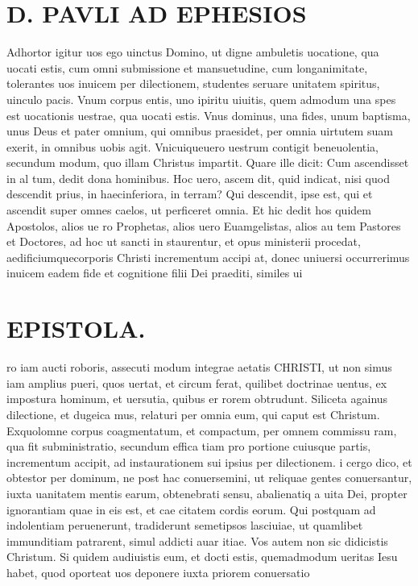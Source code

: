 \documentclass{article}
\begin{document}
\begin{pages}
\section*{D. PAVLI AD EPHESIOS }
\marginpar{[ p.2. ]}
\marginpar{[ p.3.  ]}
\marginpar{[ p.4.  ]}\pstart Adhortor igitur uos ego uinctus Domino, ut digne ambuletis uocatione, qua uocati estis, cum omni submissione et mansuetudine, cum longanimitate, tolerantes uos inuicem per dilectionem, studentes seruare unitatem spiritus, uinculo pacis.  \pend\pstart Vnum corpus entis, uno ipiritu uiuitis, quem admodum una spes est uocationis uestrae, qua uocati estis. Vnus dominus, una fides, unum baptisma, unus Deus et pater omnium, qui omnibus praesidet, per omnia uirtutem suam exerit, in omnibus uobis agit.  \pend\pstart Vnicuiqueuero uestrum contigit beneuolentia, secundum modum, quo illam Christus impartit. Quare ille dicit: Cum ascendisset in al tum, dedit dona hominibus. Hoc uero, ascem dit, quid indicat, nisi quod descendit prius, in haecinferiora, in terram? Qui descendit, ipse est, qui et ascendit super omnes caelos, ut perficeret omnia.  \pend\pstart Et hic dedit hos quidem Apostolos, alios ue ro Prophetas, alios uero Euamgelistas, alios au tem Pastores et Doctores, ad hoc ut sancti in staurentur, et opus ministerii procedat, aedificiumquecorporis Christi incrementum accipi at, donec uniuersi occurrerimus inuicem eadem fide et cognitione filii Dei praediti, similes ui  \pend
\section*{EPISTOLA. }
\marginpar{[ p.1 ]}
\marginpar{[ p.r. ]}
\marginpar{[ p.„ ]}
\marginpar{[ p.7.  ]}\pstart ro iam aucti roboris, assecuti modum integrae aetatis CHRISTI, ut non simus iam amplius pueri, quos uertat, et circum ferat, quilibet doctrinae uentus, ex impostura hominum, et uersutia, quibus er rorem obtrudunt.  \pend\pstart Siliceta againus dilectione, et dugeica mus, relaturi per omnia eum, qui caput est Christum. Exquolomne corpus coagmentatum, et compactum, per omnem commissu ram, qua fit subministratio, secundum effica tiam pro portione cuiusque partis, incrementum accipit, ad instaurationem sui ipsius per dilectionem.  \pend\pstart i cergo dico, et obtestor per dominum, ne post hac conuersemini, ut reliquae gentes conuersantur, iuxta uanitatem mentis earum, obtenebrati sensu, abalienatiq a uita Dei, propter ignorantiam quae in eis est, et cae citatem cordis eorum. Qui postquam ad indolentiam peruenerunt, tradiderunt semetipsos lasciuiae, ut quamlibet immunditiam patrarent, simul addicti auar itiae.  \pend\pstart Vos autem non sic didicistis Christum. Si quidem audiuistis eum, et docti estis, quemadmodum ueritas Iesu habet, quod oporteat uos deponere iuxta priorem conuersatio\pend

\end{pages}
\end{document}
